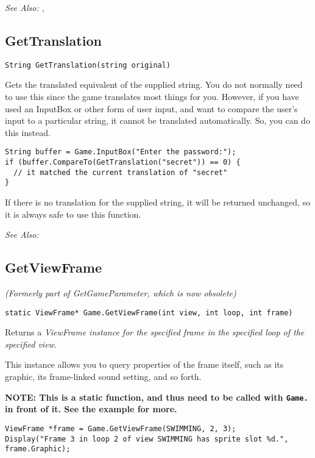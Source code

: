 \it{See Also:} , 


\subsection{GetTranslation}\label{GetTranslation}%

\begin{verbatim}
String GetTranslation(string original)
\end{verbatim}
Gets the translated equivalent of the supplied string. You do not normally
need to use this since the game translates most things for you. However,
if you have used an InputBox or other form of user input, and want to
compare the user's input to a particular string, it cannot be translated
automatically. So, you can do this instead.

\begin{verbatim}
String buffer = Game.InputBox("Enter the password:");
if (buffer.CompareTo(GetTranslation("secret")) == 0) {
  // it matched the current translation of "secret"
}
\end{verbatim}
If there is no translation for the supplied string, it will be returned
unchanged, so it is always safe to use this function.

\it{See Also:} 


\subsection{GetViewFrame}\label{Game.GetViewFrame}%

\it{(Formerly part of GetGameParameter, which is now obsolete)}

\begin{verbatim}
static ViewFrame* Game.GetViewFrame(int view, int loop, int frame)
\end{verbatim}
Returns a \it{ViewFrame} instance for the specified frame in the specified loop of the specified view.

This instance allows you to query properties of the frame itself, such as its graphic, its frame-linked
sound setting, and so forth.

\bf{NOTE:} This is a static function, and thus need to be called with \verb$Game.$ in front of it. See
the example for more.

\begin{verbatim}
ViewFrame *frame = Game.GetViewFrame(SWIMMING, 2, 3);
Display("Frame 3 in loop 2 of view SWIMMING has sprite slot %d.", frame.Graphic);
\end{verbatim}

